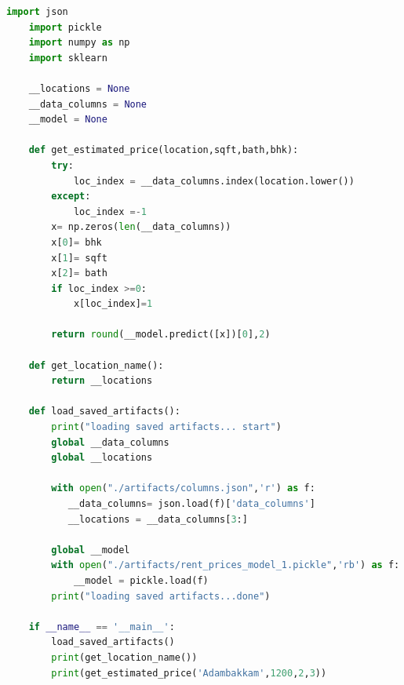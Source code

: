 \begin{lstlisting}[language=python]
    import json
    import pickle
    import numpy as np
    import sklearn
     
    __locations = None
    __data_columns = None
    __model = None
     
    def get_estimated_price(location,sqft,bath,bhk):
        try:
            loc_index = __data_columns.index(location.lower())
        except:
            loc_index =-1
        x= np.zeros(len(__data_columns))
        x[0]= bhk
        x[1]= sqft
        x[2]= bath
        if loc_index >=0:
            x[loc_index]=1
     
        return round(__model.predict([x])[0],2)
     
    def get_location_name():
        return __locations
     
    def load_saved_artifacts():
        print("loading saved artifacts... start")
        global __data_columns
        global __locations
     
        with open("./artifacts/columns.json",'r') as f:
           __data_columns= json.load(f)['data_columns']
           __locations = __data_columns[3:]
     
        global __model
        with open("./artifacts/rent_prices_model_1.pickle",'rb') as f:
            __model = pickle.load(f)
        print("loading saved artifacts...done")
     
    if __name__ == '__main__':
        load_saved_artifacts()
        print(get_location_name())
        print(get_estimated_price('Adambakkam',1200,2,3))
     
\end{lstlisting}
